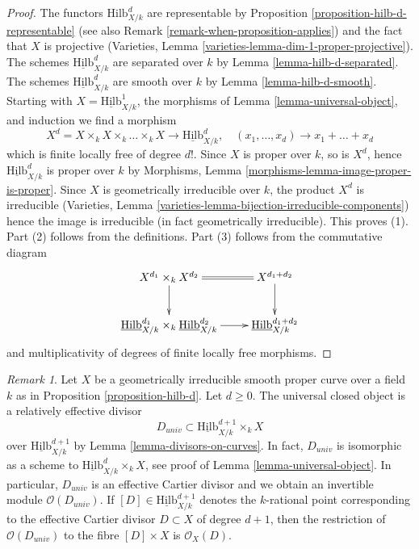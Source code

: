 \documentclass{stacks-project}
\theoremstyle{plain}
\theoremstyle{definition}
\theoremstyle{remark}
\newtheorem{remark}[subsection]{Remark}
\numberwithin{equation}{subsection}
\def\Hilbfunctor{\mathrm{Hilb}}
\begin{document}
\begin{proof}
The functors $\Hilbfunctor^d_{X/k}$ are representable by
Proposition \ref{proposition-hilb-d-representable}
(see also Remark \ref{remark-when-proposition-applies})
and the fact that $X$ is projective
(Varieties, Lemma \ref{varieties-lemma-dim-1-proper-projective}).
The schemes $\underline{\Hilbfunctor}^d_{X/k}$ are separated
over $k$ by Lemma \ref{lemma-hilb-d-separated}.
The schemes $\underline{\Hilbfunctor}^d_{X/k}$ are smooth
over $k$ by Lemma \ref{lemma-hilb-d-smooth}.
Starting with $X = \underline{\Hilbfunctor}^1_{X/k}$,
the morphisms of Lemma \ref{lemma-universal-object},
and induction we find a morphism
$$
X^d = X \times_k X \times_k \ldots \times_k X \longrightarrow
\underline{\Hilbfunctor}^d_{X/k},\quad
(x_1, \ldots, x_d) \longrightarrow x_1 + \ldots + x_d
$$
which is finite locally free of degree $d!$. Since $X$ is
proper over $k$, so is $X^d$, hence
$\underline{\Hilbfunctor}^d_{X/k}$ is proper over $k$ by
Morphisms, Lemma \ref{morphisms-lemma-image-proper-is-proper}.
Since $X$ is geometrically irreducible over $k$, the product
$X^d$ is irreducible
(Varieties, Lemma \ref{varieties-lemma-bijection-irreducible-components})
hence the image is irreducible (in fact geometrically irreducible).
This proves (1). Part (2) follows from the definitions. Part (3) follows
from the commutative diagram
$$
\xymatrix{
X^{d_1} \times_k X^{d_2} \ar[d] \ar@{=}[r] & X^{d_1 + d_2} \ar[d] \\
\underline{\Hilbfunctor}^{d_1}_{X/k}
\times_k
\underline{\Hilbfunctor}^{d_2}_{X/k}
\ar[r] &
\underline{\Hilbfunctor}^{d_1 + d_2}_{X/k}
}
$$
and multiplicativity of degrees of finite locally free morphisms.
\end{proof}

\begin{remark}
\label{remark-universal-object-hilb-d}
Let $X$ be a geometrically irreducible smooth proper curve over a field $k$
as in Proposition \ref{proposition-hilb-d}. Let $d \geq 0$. The universal
closed object is a relatively effective divisor
$$
D_{univ} \subset \underline{\Hilbfunctor}^{d + 1}_{X/k} \times_k X
$$
over $\underline{\Hilbfunctor}^{d + 1}_{X/k}$ by
Lemma \ref{lemma-divisors-on-curves}.
In fact, $D_{univ}$ is isomorphic as a scheme to
$\underline{\Hilbfunctor}^d_{X/k} \times_k X$, see proof of
Lemma \ref{lemma-universal-object}.
In particular, $D_{univ}$ is an effective Cartier divisor and
we obtain an invertible module
$\mathcal{O}(D_{univ})$. If $[D] \in \underline{\Hilbfunctor}^{d + 1}_{X/k}$
denotes the $k$-rational point corresponding to the effective
Cartier divisor $D \subset X$ of degree $d + 1$, then the restriction
of $\mathcal{O}(D_{univ})$ to the fibre $[D] \times X$ is
$\mathcal{O}_X(D)$.
\end{remark}
\end{document}

